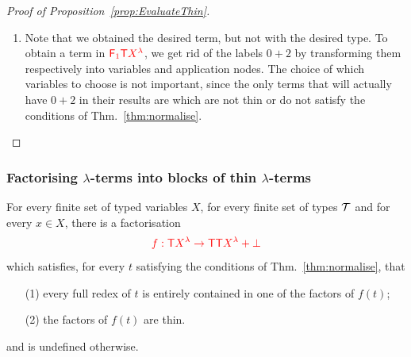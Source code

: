 \begin{proof}[Proof of Proposition~\ref{prop:EvaluateThin}]
\begin{enumerate}
\item Note that we obtained the desired term, but not with the desired type. To obtain a term in 
${\color{red}{{\color{red}{\mathsf F_{1}}}{\color{red}{\mathsf T}}{X^\lambda}}}$, we get rid of the labels $0+2$ by transforming them respectively into variables and application nodes. The choice of which variables to choose is not important, since the only terms that will actually have $0+2$ in their results are \lambdaterms which are not thin or do not satisfy the conditions of Thm.~\ref{thm:normalise}.
\end{enumerate}
\end{proof}

  



\subsubsection{Factorising $\lambda$-terms into blocks of thin $\lambda$-terms}\label{subsub:facto}



\begin{proposition}\label{prop:FactoIntoThin} For every finite set of typed variables $X$, for every finite set of types ${\mathcal T}$ and for every $x\in X$, there is a factorisation $${\color{red}{f:{\color{red}{\mathsf T}}{\color{red}{X^\lambda}} \to {\color{red}{\mathsf T}}{\color{red}{\mathsf T}}{\color{red}{X^\lambda}}+\bot}}$$ 
which satisfies, for every \lambdaterm $t$ satisfying the conditions of Thm.~\ref{thm:normalise}, that
\begin{itemize}
\item[(1)] every full redex of $t$ is entirely contained in one of the factors of $f(t)$;
\item[(2)] the factors of $f(t)$ are thin.
\end{itemize}
and is undefined otherwise.
\end{proposition}

